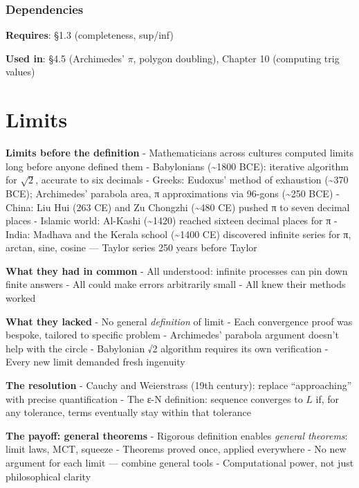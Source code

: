 \documentclass[
  10pt,
  letterpaper,
]{scrbook}
\begin{document}
\subsection{Dependencies}\label{dependencies-4}

\textbf{Requires}: §1.3 (completeness, sup/inf)

\textbf{Used in}: §4.5 (Archimedes' \(\pi\), polygon doubling), Chapter
10 (computing trig values)

\chapter{Limits}\label{limits}

\textbf{Limits before the definition} - Mathematicians across cultures
computed limits long before anyone defined them - Babylonians
(\textasciitilde1800 BCE): iterative algorithm for \(\sqrt{2}\),
accurate to six decimals - Greeks: Eudoxus' method of exhaustion
(\textasciitilde370 BCE); Archimedes' parabola area, π approximations
via 96-gons (\textasciitilde250 BCE) - China: Liu Hui (263 CE) and Zu
Chongzhi (\textasciitilde480 CE) pushed π to seven decimal places -
Islamic world: Al-Kashi (\textasciitilde1420) reached sixteen decimal
places for π - India: Madhava and the Kerala school (\textasciitilde1400
CE) discovered infinite series for π, arctan, sine, cosine --- Taylor
series 250 years before Taylor

\textbf{What they had in common} - All understood: infinite processes
can pin down finite answers - All could make errors arbitrarily small -
All knew their methods worked

\textbf{What they lacked} - No general \emph{definition} of limit - Each
convergence proof was bespoke, tailored to specific problem -
Archimedes' parabola argument doesn't help with the circle - Babylonian
√2 algorithm requires its own verification - Every new limit demanded
fresh ingenuity

\textbf{The resolution} - Cauchy and Weierstrass (19th century): replace
``approaching'' with precise quantification - The ε-N definition:
sequence converges to \(L\) if, for any tolerance, terms eventually stay
within that tolerance

\textbf{The payoff: general theorems} - Rigorous definition enables
\emph{general theorems}: limit laws, MCT, squeeze - Theorems proved
once, applied everywhere - No new argument for each limit --- combine
general tools - Computational power, not just philosophical clarity
\end{document}
